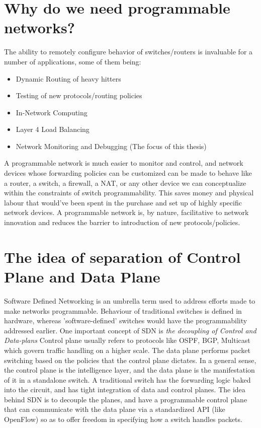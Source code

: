 \section{Why do we need programmable networks?}
The ability to remotely configure behavior of switches/routers is invaluable for a number of applications,
some of them being:
\begin{itemize}
  \item Dynamic Routing of heavy hitters
  \item Testing of new protocols/routing policies
  \item In-Network Computing
  \item Layer 4 Load Balancing
  \item Network Monitoring and Debugging (The focus of this thesis)
\end{itemize}
A programmable network is much easier to monitor and control, and network devices whose forwarding policies can be
customized can be made to behave like a router, a switch, a firewall, a NAT, or any other device we can conceptualize
within the constraints of switch programmability. This saves money and physical labour that would've been
spent in the purchase and set up of highly specific network devices. A programmable network is, by nature, facilitative
to network innovation and reduces the barrier to introduction of new protocols/policies.

\section{The idea of separation of Control Plane and Data Plane}
Software Defined Networking is an umbrella term used to address efforts made to make networks programmable. Behaviour of
traditional switches is defined in hardware, whereas 'software-defined' switches would have the programmability addressed
earlier. One important concept of SDN is \textit{the decoupling of Control and Data-plans}
Control plane usually refers to protocols like OSPF, BGP, Multicast which govern traffic handling on a higher scale. The 
data plane performs packet switching based on the policies that the control plane dictates. In a general sense, the control
plane is the intelligence layer, and the data plane is the manifestation of it in a standalone switch.
\newline
A traditional switch has the forwarding logic baked into the circuit, and has tight integration of data and control planes.
The idea behind SDN is to decouple the planes, and have a programmable control plane that can communicate with the data plane
via a standardized API (like OpenFlow) so as to offer freedom in specifying how a switch handles packets.


